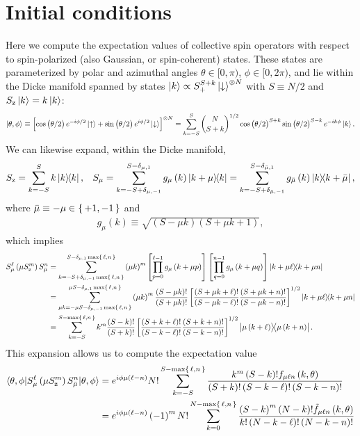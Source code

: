 \documentclass[aps,pra,twocolumn,longbibliography]{revtex4-2}
\newcommand{\f}[2]{\dfrac{#1}{#2}} %
\newcommand{\p}[1]{\left( #1 \right)} %
\renewcommand{\sp}[1]{\left[ #1 \right]} %
\newcommand{\bk}{\braket} %
\newcommand{\z}{\text{z}}
\newcommand{\bmu}{{\bar\mu}}
\newcommand{\1}{\mathds{1}}
\newcommand{\up}{\uparrow}
\newcommand{\dn}{\downarrow}
\begin{document}
\section{Initial conditions}
\label{sec:initial_conditions}

Here we compute the expectation values of collective spin operators
with respect to spin-polarized (also Gaussian, or spin-coherent)
states.  These states are parameterized by polar and azimuthal angles
$\theta\in[0,\pi)$, $\phi\in[0,2\pi)$, and lie within the Dicke
manifold spanned by states
$\ket{k}\propto S_+^{S+k}\ket{\dn}^{\otimes N}$ with $S\equiv N/2$ and
$S_\z\ket{k}=k\ket{k}$:
\begin{align}
  \ket{\theta,\phi}
  \equiv \sp{\cos\p{\theta/2} e^{-i\phi/2} \ket\up
    + \sin\p{\theta/2} e^{i\phi/2} \ket\dn}^{\otimes N}
  = \sum_{k=-S}^S { N \choose S+k }^{1/2}
  \cos\p{\theta/2}^{S+k} \sin\p{\theta/2}^{S-k} e^{-ik\phi} \ket{k}.
\end{align}
We can likewise expand, within the Dicke manifold,
\begin{align}
  S_\z = \sum_{k=-S}^S k \op{k},
  &&
  S_\mu = \sum_{k=-S+\delta_{\mu,-1}}^{S-\delta_{\mu,1}}
  g_\mu\p{k} \op{k+\mu}{k}
  = \sum_{k=-S+\delta_{\bmu,-1}}^{S-\delta_{\bmu,1}}
  g_\bmu\p{k} \op{k}{k+\bmu},
\end{align}
where $\bmu\equiv-\mu\in\set{+1,-1}$ and
\begin{align}
  g_\mu\p{k} \equiv \sqrt{\p{S-\mu k}\p{S+\mu k+1}},
\end{align}
which implies
\begin{align}
  S_\mu^\ell \p{\mu S_\z^m} S_\bmu^n
  &= \sum_{k=-S+\delta_{\mu,-1}\max\set{\ell,n}}
  ^{S-\delta_{\mu,1}\max\set{\ell,n}} \p{\mu k}^m
  \sp{\prod_{p=0}^{\ell-1} g_\mu\p{k+\mu p}}
  \sp{\prod_{q=0}^{n-1} g_\mu\p{k+\mu q}}
  \op{k+\mu\ell}{k+\mu n} \\
  &= \sum_{\mu k=-\mu S-\delta_{\mu,-1}\max\set{\ell,n}}
  ^{\mu S-\delta_{\mu,1}\max\set{\ell,n}} \p{\mu k}^m
  \f{\p{S-\mu k}!}{\p{S+\mu k}!}
  \sp{\f{\p{S+\mu k+\ell}!}{\p{S-\mu k-\ell}!}
    \f{\p{S+\mu k+n}!}{\p{S-\mu k-n}!}}^{1/2}
  \op{k+\mu\ell}{k+\mu n} \\
  &= \sum_{k=-S}^{S-\max\set{\ell,n}} k^m
  \f{\p{S-k}!}{\p{S+k}!}
  \sp{\f{\p{S+k+\ell}!}{\p{S-k-\ell}!}
    \f{\p{S+k+n}!}{\p{S-k-n}!}}^{1/2}
  \op{\mu\p{k+\ell}}{\mu\p{k+n}}.
\end{align}
This expansion allows us to compute the expectation value
\begin{align}
  \bk{\theta,\phi|S_\mu^\ell \p{\mu S_\z^m} S_\bmu^n|\theta,\phi}
  &= e^{i\phi \mu\p{\ell-n}} N! \sum_{k=-S}^{S-\max\set{\ell,n}}
  \f{k^m \p{S-k}! f_{\mu\ell n}\p{k,\theta}}
  {\p{S+k}! \p{S-k-\ell}! \p{S-k-n}!} \\
  &= e^{i\phi \mu\p{\ell-n}} \p{-1}^m N! \sum_{k=0}^{N-\max\set{\ell,n}}
  \f{\p{S-k}^m \p{N-k}! \tilde f_{\mu\ell n}\p{k,\theta}}
  {k! \p{N-k-\ell}! \p{N-k-n}!}
\end{align}
\end{document}
